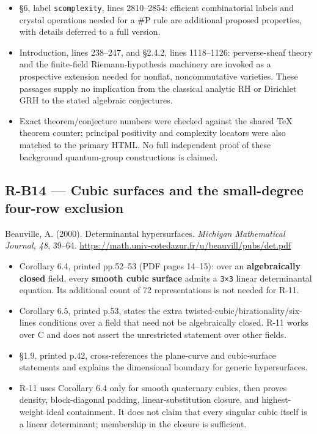 \documentclass[11pt,a4paper]{article}
\providecommand{\tightlist}{\setlength{\itemsep}{0pt}\setlength{\parskip}{0pt}}
\theoremstyle{definition}\newtheorem{definition}{Definition}
\begin{document}
\begin{itemize}
  \nolinkurl{cposkroneckerright}; §3.5.1, Conjectures 3.5--3.6, labels
  \nolinkurl{cnonstdposright}, \nolinkurl{cnonstdposright1}; §3.5.2,
  Conjecture 3.7, label \nolinkurl{coppquasicell}.
\item
  §6, label \nolinkurl{scomplexity}, lines 2810--2854: efficient
  combinatorial labels and crystal operations needed for a \#P rule are
  additional proposed properties, with details deferred to a full
  version.
\item
  Introduction, lines 238--247, and §2.4.2, lines 1118--1126:
  perverse-sheaf theory and the finite-field Riemann-hypothesis
  machinery are invoked as a prospective extension needed for nonflat,
  noncommutative varieties. These passages supply no implication from
  the classical analytic RH or Dirichlet GRH to the stated algebraic
  conjectures.
\item
  Exact theorem/conjecture numbers were checked against the shared TeX
  theorem counter; principal positivity and complexity locators were
  also matched to the primary HTML. No full independent proof of these
  background quantum-group constructions is claimed.
\end{itemize}

\subsection{R-B14 --- Cubic surfaces and the small-degree four-row
exclusion}\label{r-b14--cubic-surfaces-and-the-small-degree-four-row-exclusion}

Beauville, A. (2000). Determinantal hypersurfaces. \emph{Michigan
Mathematical Journal, 48}, 39--64.
\url{https://math.univ-cotedazur.fr/u/beauvill/pubs/det.pdf}

\begin{itemize}
\tightlist
\item
  Corollary 6.4, printed pp.52--53 (PDF pages 14--15): over an
  \textbf{algebraically closed} field, every \textbf{smooth cubic
  surface} admits a \nolinkurl{3×3} linear determinantal equation. Its
  additional count of 72 representations is not needed for R-11.
\item
  Corollary 6.5, printed p.53, states the extra
  twisted-cubic/birationality/six-lines conditions over a field that
  need not be algebraically closed. R-11 works over C and does not
  assert the unrestricted statement over other fields.
\item
  §1.9, printed p.42, cross-references the plane-curve and cubic-surface
  statements and explains the dimensional boundary for generic
  hypersurfaces.
\item
  R-11 uses Corollary 6.4 only for smooth quaternary cubics, then proves
  density, block-diagonal padding, linear-substitution closure, and
  highest-weight ideal containment. It does not claim that every
  singular cubic itself is a linear determinant; membership in the
  closure is sufficient.
\end{itemize}
\end{document}
